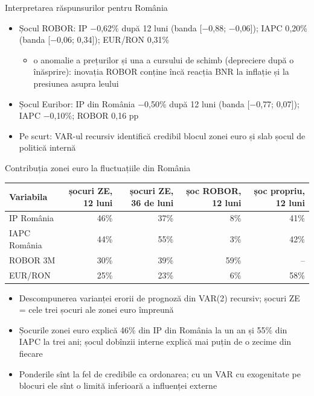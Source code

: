 \begin{frame}{Interpretarea răspunsurilor pentru România}
\itemsize{\small}
\begin{itemize}
    \item Șocul ROBOR: IP \ensuremath{-}0{,}62\% după 12 luni (banda [\ensuremath{-}0{,}88; \ensuremath{-}0{,}06]); IAPC 0{,}20\% (banda [\ensuremath{-}0{,}06; 0{,}34]); EUR/RON 0{,}31\%
    \begin{itemize}
        \item o anomalie a prețurilor și una a cursului de schimb (depreciere după o înăsprire): inovația ROBOR conține încă reacția BNR la inflație și la presiunea asupra leului
    \end{itemize}
    \item Șocul Euribor: IP din România \ensuremath{-}0{,}50\% după 12 luni (banda [\ensuremath{-}0{,}77; 0{,}07]); IAPC \ensuremath{-}0{,}10\%; ROBOR 0{,}16 pp
    \item Pe scurt: VAR-ul recursiv identifică credibil blocul zonei euro și slab șocul de politică internă
\end{itemize}
\end{frame}

\begin{frame}{Contribuția zonei euro la fluctuațiile din România}
\itemsize{\small}
\begin{center}
\scriptsize
\begin{tabular}{lrrrr}
\toprule
\textbf{Variabila} & \textbf{șocuri ZE, 12 luni} & \textbf{șocuri ZE, 36 de luni} & \textbf{șoc ROBOR, 12 luni} & \textbf{șoc propriu, 12 luni} \\
\midrule
IP România & 46\% & 37\% & 8\% & 41\% \\
IAPC România & 44\% & 55\% & 3\% & 42\% \\
ROBOR 3M & 30\% & 39\% & 59\% & -- \\
EUR/RON & 25\% & 23\% & 6\% & 58\% \\
\bottomrule
\end{tabular}
\end{center}
\begin{itemize}
    \item Descompunerea varianței erorii de prognoză din VAR(2) recursiv; șocuri ZE = cele trei șocuri ale zonei euro împreună
    \item Șocurile zonei euro explică 46\% din IP din România la un an și 55\% din IAPC la trei ani; șocul dobînzii interne explică mai puțin de o zecime din fiecare
    \item Ponderile sînt la fel de credibile ca ordonarea; cu un VAR cu exogenitate pe blocuri ele sînt o limită inferioară a influenței externe
\end{itemize}
\end{frame}

